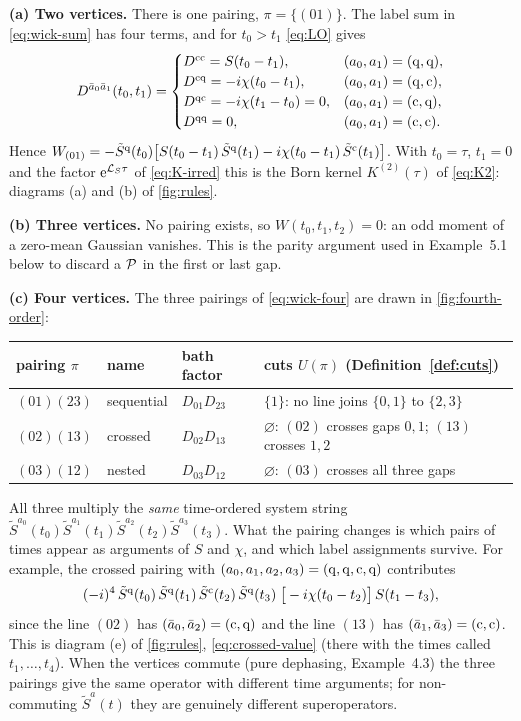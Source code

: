 \begin{exbox}
\textbf{(a) Two vertices.}
There is one pairing, $\pi=\{(01)\}$.
The label sum in \cref{eq:wick-sum} has four terms, and for $t_0>t_1$ \cref{eq:LO} gives
\begin{equation*}
  D^{\bar a_0\bar a_1}(t_0,t_1)=
  \begin{cases}
    D^{\mathrm{c}\mathrm{c}}=S(t_0-t_1), & (a_0,a_1)=(\mathrm{q},\mathrm{q}),\\
    D^{\mathrm{c}\mathrm{q}}=-i\chi(t_0-t_1), & (a_0,a_1)=(\mathrm{q},\mathrm{c}),\\
    D^{\mathrm{q}\mathrm{c}}=-i\chi(t_1-t_0)=0, & (a_0,a_1)=(\mathrm{c},\mathrm{q}),\\
    D^{\mathrm{q}\mathrm{q}}=0, & (a_0,a_1)=(\mathrm{c},\mathrm{c}).
  \end{cases}
\end{equation*}
Hence $W_{(01)}=-\tilde S^{\mathrm{q}}(t_0)\big[S(t_0-t_1)\,\tilde S^{\mathrm{q}}(t_1)-i\chi(t_0-t_1)\,\tilde S^{\mathrm{c}}(t_1)\big]$.
With $t_0=\tau$, $t_1=0$ and the factor $\mathrm{e}^{\mathcal{L}_S\tau}$ of \cref{eq:K-irred} this is the Born kernel $K^{(2)}(\tau)$ of \cref{eq:K2}: diagrams (a) and (b) of \cref{fig:rules}.

\medskip \textbf{(b) Three vertices.}
No pairing exists, so $W(t_0,t_1,t_2)=0$: an odd moment of a zero-mean Gaussian vanishes.
This is the parity argument used in Example~5.1 below to discard a $\mathcal{P}$ in the first or last gap.

\medskip \textbf{(c) Four vertices.}
The three pairings of \cref{eq:wick-four} are drawn in \cref{fig:fourth-order}:
\begin{center}
\begin{tabular}{llll}
\toprule
pairing $\pi$ & name & bath factor & cuts $U(\pi)$ (Definition~\ref{def:cuts})\\
\midrule
$(01)(23)$ & sequential & $D_{01}D_{23}$ & $\{1\}$: no line joins $\{0,1\}$ to $\{2,3\}$\\
$(02)(13)$ & crossed & $D_{02}D_{13}$ & $\varnothing$: $(02)$ crosses gaps $0,1$; $(13)$ crosses $1,2$\\
$(03)(12)$ & nested & $D_{03}D_{12}$ & $\varnothing$: $(03)$ crosses all three gaps\\
\bottomrule
\end{tabular}
\end{center}
All three multiply the \emph{same} time-ordered system string $\tilde S^{a_0}(t_0)\tilde S^{a_1}(t_1)\tilde S^{a_2}(t_2)\tilde S^{a_3}(t_3)$.
What the pairing changes is which pairs of times appear as arguments of $S$ and $\chi$, and which label assignments survive.
For example, the crossed pairing with $(a_0,a_1,a_2,a_3)=(\mathrm{q},\mathrm{q},\mathrm{c},\mathrm{q})$ contributes
\begin{equation*}
  (-i)^4\,\tilde S^{\mathrm{q}}(t_0)\,\tilde S^{\mathrm{q}}(t_1)\,\tilde S^{\mathrm{c}}(t_2)\,\tilde S^{\mathrm{q}}(t_3)\;\big[-i\chi(t_0-t_2)\big]\,S(t_1-t_3),
\end{equation*}
since the line $(02)$ has $(\bar a_0,\bar a_2)=(\mathrm{c},\mathrm{q})$ and the line $(13)$ has $(\bar a_1,\bar a_3)=(\mathrm{c},\mathrm{c})$.
This is diagram (e) of \cref{fig:rules}, \cref{eq:crossed-value} (there with the times called $t_1,\dots,t_4$).
When the vertices commute (pure dephasing, Example~4.3) the three pairings give the same operator with different time arguments; for non-commuting $\tilde S^a(t)$ they are genuinely different superoperators.


\end{exbox}
